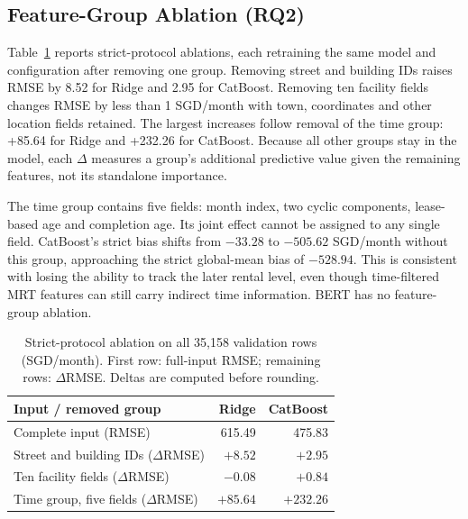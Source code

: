 \subsection{Feature-Group Ablation (RQ2)}
Table~\ref{tab:ablation} reports strict-protocol ablations, each retraining the same model and configuration after removing one group.  Removing street and building IDs raises RMSE by 8.52 for Ridge and 2.95 for CatBoost.  Removing ten facility fields changes RMSE by less than 1 SGD/month with town, coordinates and other location fields retained.  The largest increases follow removal of the time group: +85.64 for Ridge and +232.26 for CatBoost.  Because all other groups stay in the model, each $\Delta$ measures a group's additional predictive value given the remaining features, not its standalone importance.

The time group contains five fields: month index, two cyclic components, lease-based age and completion age.  Its joint effect cannot be assigned to any single field.  CatBoost's strict bias shifts from $-33.28$ to $-505.62$ SGD/month without this group, approaching the strict global-mean bias of $-528.94$.  This is consistent with losing the ability to track the later rental level, even though time-filtered MRT features can still carry indirect time information.  BERT has no feature-group ablation.

\begin{table}[t]
\caption{Strict-protocol ablation on all 35,158 validation rows (SGD/month). First row: full-input RMSE; remaining rows: $\Delta$RMSE. Deltas are computed before rounding.}
\label{tab:ablation}
\centering
\footnotesize
\begin{tabularx}{\columnwidth}{@{}Xrr@{}}
\toprule
Input / removed group & Ridge & CatBoost \\
\midrule
Complete input (RMSE) & 615.49 & 475.83 \\
\midrule
Street and building IDs ($\Delta$RMSE) & $+8.52$ & $+2.95$ \\
Ten facility fields ($\Delta$RMSE) & $-0.08$ & $+0.84$ \\
Time group, five fields ($\Delta$RMSE) & $+85.64$ & $+232.26$ \\
\bottomrule
\end{tabularx}
\end{table}

